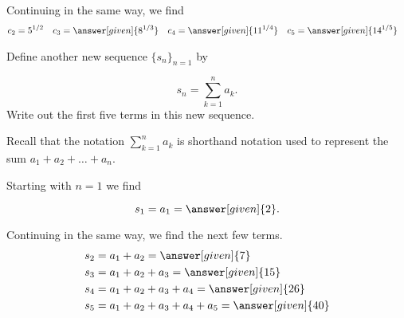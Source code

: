 \documentclass{ximera}
\begin{document}
\begin{example}
\begin{question}
\begin{explanation}
Continuing in the same way, we find     
     \begin{align*}
      	c_2 &=  5^{1/2}  & 
	c_3 &= \answer[given]{8^{1/3}}   & 
	c_4 &= \answer[given]{11^{1/4}}   & 
	c_5 &=  \answer[given]{14^{1/5}}   
    \end{align*}
    
\end{explanation}
\end{question}

\begin{question}
Define another new sequence $\{s_n\}_{n=1}$ by 

\[
s_n = \sum_{k=1}^n a_k .
\]
Write out the first five terms in this new sequence.

Recall that the notation $\sum_{k=1}^n a_k$ is shorthand notation used to represent the sum $a_1+a_2+\ldots +a_n$.



\begin{explanation}
Starting with $n=1$ we find

\[      s_1 = a_1 = \answer[given]{2}.      \]
      
Continuing in the same way, we find the next few terms.    
     \begin{align*}
      	s_2 &=  a_1 +a_2 = \answer[given]{7}  \\ 
	s_3 &=  a_1 +a_2 + a_3 = \answer[given]{15}   \\ 
	s_4 &=  a_1 +a_2 +a_3 +a_4= \answer[given]{26}  \\ 
	s_5 &=  a_1 +a_2 +a_3+a_4+a_5= \answer[given]{40}    
    \end{align*}
\end{explanation}
\end{question}
\end{example}
\end{document}
